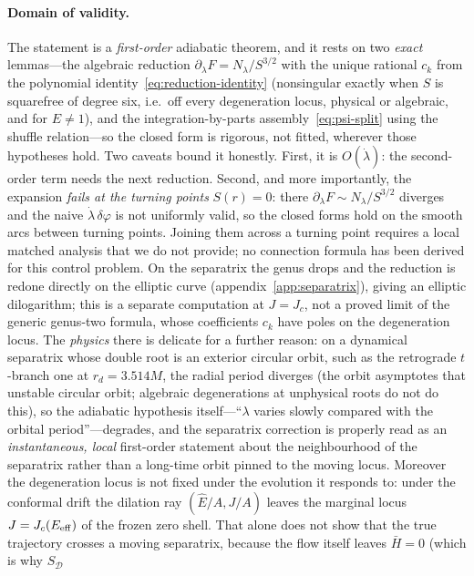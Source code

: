 \documentclass[12pt]{iopart}
\theoremstyle{plain}
\theoremstyle{definition}
\theoremstyle{remark}
\newcommand{\Ehat}{\hat E}
\newcommand{\Jc}{J_{c}}
\begin{document}
\paragraph{Domain of validity.} The statement is a \emph{first-order} adiabatic
theorem, and it rests on two \emph{exact} lemmas---the algebraic reduction
$\partial_\lambda F=N_\lambda/S^{3/2}$ with the unique rational $c_k$ from the
polynomial identity~\eqref{eq:reduction-identity} (nonsingular exactly when $S$ is squarefree of degree six, i.e.\ off every degeneration
locus, physical or algebraic, and for $E\neq1$), and the integration-by-parts
assembly~\eqref{eq:psi-split} using the shuffle relation---so the closed form is
rigorous, not fitted, wherever those hypotheses hold. Two caveats bound it honestly.
First, it is $O(\dot\lambda)$: the second-order term needs the next reduction.
Second, and more importantly, the expansion \emph{fails at the turning points}
$S(r)=0$: there $\partial_\lambda F\sim N_\lambda/S^{3/2}$ diverges and the naive
$\dot\lambda\,\delta\varphi$ is not uniformly valid, so the closed forms hold on the
smooth arcs between turning points. Joining them across a turning point requires a local
matched analysis that we do not provide; no connection formula has been derived for this
control problem. On the separatrix the genus drops and the reduction is redone directly on the
elliptic curve (appendix~\ref{app:separatrix}), giving an elliptic dilogarithm; this is a
separate computation at $J=\Jc$, not a proved limit of the generic genus-two formula, whose
coefficients $c_k$ have poles on the degeneration locus. The \emph{physics} there is
delicate for a further reason:
on a dynamical separatrix whose double root is an exterior circular orbit, such as the
retrograde $t$-branch one at $r_d=3.514M$, the radial period diverges (the orbit asymptotes
that unstable circular orbit; algebraic degenerations at unphysical roots do not do this), so the
adiabatic hypothesis itself---``$\lambda$ varies slowly compared with the orbital
period''---degrades, and the separatrix correction is properly read as an
\emph{instantaneous, local} first-order statement about the neighbourhood of the
separatrix rather than a long-time orbit pinned to the moving locus. Moreover the degeneration
locus is not fixed under the evolution it responds to: under the conformal drift the
dilation ray $(\Ehat/A,J/A)$ leaves the marginal locus $J=\Jc(E_{\rm eff})$ of the frozen
zero shell. That alone does not show that the true trajectory crosses a moving
separatrix, because the flow itself leaves $\bar H=0$ (which is why $S_{\mathcal D}$
\end{document}
